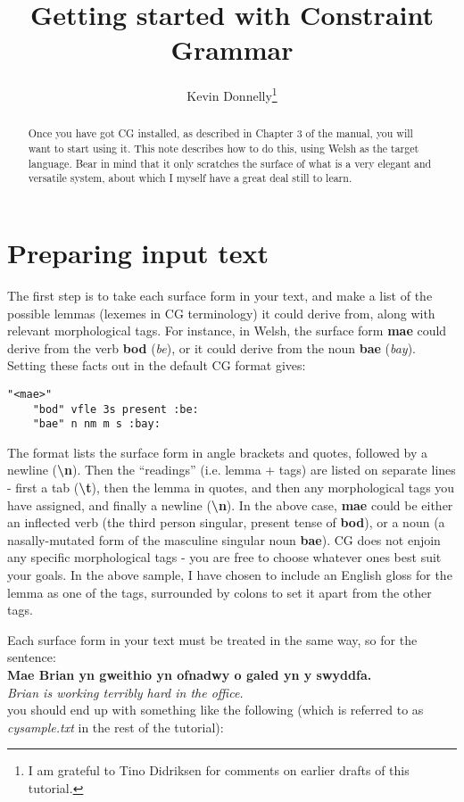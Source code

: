 \documentclass[a4paper,10pt]{article}
\title{Getting started with Constraint Grammar}
\author{Kevin Donnelly\thanks{I am grateful to Tino Didriksen for comments on earlier drafts of this tutorial.}}
\date{}
\begin{document}
\maketitle

\begin{abstract}
Once you have got CG installed, as described in Chapter 3 of the manual, you will want to start using it.  This note describes how to do this, using Welsh as the target language.  Bear in mind that it only scratches the surface of what is a very elegant and versatile system, about which I myself have a great deal still to learn.
\end{abstract}

\section{Preparing input text}

The first step is to take each surface form in your text, and make a list of the possible lemmas (lexemes in CG terminology) it could derive from, along with relevant morphological tags.  For instance, in Welsh, the surface form \textbf{mae} could derive from the verb \textbf{bod} (\textit{be}), or it could derive from the noun \textbf{bae} (\textit{bay}).  Setting these facts out in the default CG format gives:
\begin{Verbatim}[tabsize=4]
"<mae>"
	"bod" vfle 3s present :be:
	"bae" n nm m s :bay:
\end{Verbatim}

The format lists the surface form in angle brackets and quotes, followed by a newline (\textbf{\textbackslash n}).  Then the ``readings'' (i.e. lemma + tags) are listed on separate lines - first a tab (\textbf{\textbackslash t}), then the lemma in quotes, and then any morphological tags you have assigned, and finally a newline (\textbf{\textbackslash n}).  In the above case, \textbf{mae} could be either an inflected verb (the third person singular, present tense of \textbf{bod}), or a noun (a nasally-mutated form of the masculine singular noun \textbf{bae}).  CG does not enjoin any specific morphological tags - you are free to choose whatever ones best suit your goals.  In the above sample, I have chosen to include an English gloss for the lemma as one of the tags, surrounded by colons to set it apart from the other tags.

Each surface form in your text must be treated in the same way, so for the sentence:\\
\textbf{Mae Brian yn gweithio yn ofnadwy o galed yn y swyddfa.}\\
\textit{Brian is working terribly hard in the office.}\\
you should end up with something like the following (which is referred to as \textit{cysample.txt} in the rest of the tutorial):
\end{document}
